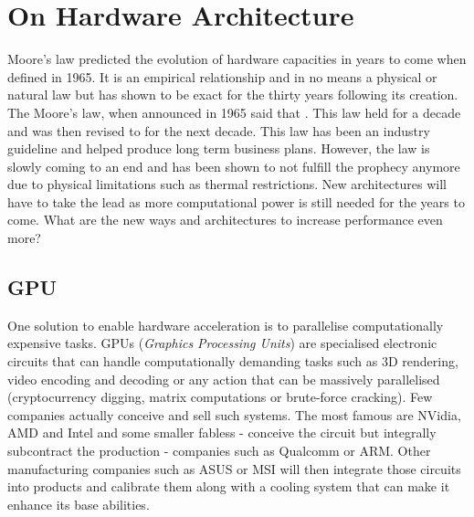 

\section{On Hardware Architecture}

Moore's law \cite{Moore2006} predicted the evolution of hardware capacities in years to come when defined in 1965. It is an empirical relationship and in no means a physical or natural law but has shown to be exact for the thirty years following its creation. The Moore's law, when announced in 1965 said that . This law held for a decade and was then revised to  for the next decade. This law has been an industry guideline and helped produce long term business plans. However, the law is slowly coming to an end and has been shown to not fulfill the prophecy anymore due to physical limitations such as thermal restrictions. New architectures will have to take the lead as more computational power is still needed for the years to come. What are the new ways and architectures to increase performance even more?


\subsection{GPU}

One solution to enable hardware acceleration is to parallelise computationally expensive tasks. GPUs (\emph{Graphics Processing Units}) are specialised electronic circuits that can handle computationally demanding tasks such as 3D rendering, video encoding and decoding or any action that can be massively parallelised (cryptocurrency digging, matrix computations or brute-force cracking). Few companies actually conceive and sell such systems. The most famous are NVidia, AMD and Intel and some smaller fabless - conceive the circuit but integrally subcontract the production -  companies such as Qualcomm or ARM. Other manufacturing companies such as ASUS or MSI will then integrate those circuits into products and calibrate them along with a cooling system that can make it enhance its base abilities.

